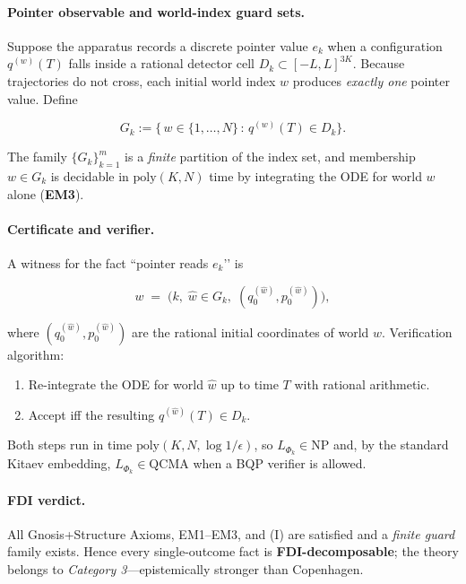 \documentclass[12pt]{article}
\theoremstyle{definition}
\theoremstyle{plain}
\begin{document}
\paragraph{Pointer observable and world-index guard sets.}
Suppose the apparatus records a discrete pointer value
$e_k$ when a configuration $q^{(w)}(T)$ falls inside a rational
detector cell $D_k\subset[-L,L]^{3K}$.  Because trajectories do not
cross, each initial world index $w$ produces \emph{exactly one} pointer
value.  Define

\[
   G_k := \bigl\{\,w\in\{1,\dots,N\}\,:\,
               q^{(w)}(T)\in D_k \bigr\}.
\]

The family $\{G_k\}_{k=1}^{m}$ is a \emph{finite} partition of the
index set, and membership $w\in G_k$ is decidable in
$\mathrm{poly}(K,N)$ time by integrating the ODE for world $w$ alone
(\textbf{EM3}).

\paragraph{Certificate and verifier.}
A witness for the fact ``pointer reads $e_k$’’ is

\[
   w \;=\; \bigl(k,\; \hat w \in G_k,\;
               (q^{(\hat w)}_0,p^{(\hat w)}_0)\bigr),
\]

where $(q^{(\hat w)}_0,p^{(\hat w)}_0)$ are the rational initial
coordinates of world $\hat w$.  Verification algorithm:

\begin{enumerate}[leftmargin=15pt,itemsep=2pt]
  \item Re-integrate the ODE for world $\hat w$ up to time $T$ with
        rational arithmetic.
  \item Accept iff the resulting $q^{(\hat w)}(T)\in D_k$.
\end{enumerate}

Both steps run in time $\mathrm{poly}(K,N,\log 1/\epsilon)$, so
$L_{\Phi_k}\in\mathrm{NP}$ and, by the standard Kitaev embedding,
$L_{\Phi_k}\in\mathrm{QCMA}$ when a BQP verifier is allowed.

\paragraph{FDI verdict.}
All Gnosis+Structure Axioms, EM1–EM3, and (I) are satisfied and a
\emph{finite guard} family exists.  Hence every single-outcome fact is
\textbf{FDI-decomposable}; the theory belongs to
\emph{Category 3}—epistemically stronger than Copenhagen.
\end{document}
